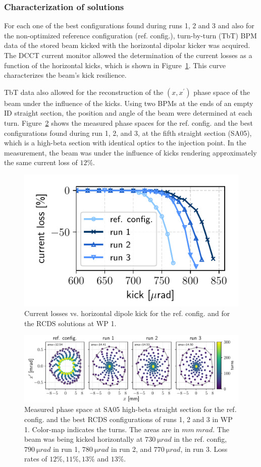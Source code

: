 \subsubsection{Characterization of solutions}
For each one of the best configurations found during runs 1, 2 and 3 and also for the non-optimized reference configuration (ref. config.), turn-by-turn (TbT) BPM data of the stored beam kicked with the horizontal dipolar kicker was acquired. The DCCT current monitor allowed the determination of the current losses as a function of the horizontal kicks, which is shown in Figure~\ref{fig:loss_kicks}. This curve characterizes the beam's kick resilience.

TbT data also allowed for the reconstruction of the $(x,x^\prime)$ phase space of the beam under the influence of the kicks. Using two BPMs at the ends of an empty ID straight section, the position and angle of the beam were determined at each turn.
Figure~\ref{fig:oldtunes_phase} shows the measured phase spaces for the ref. config. and the best configurations found during run 1, 2, and 3, at the fifth straight section (SA05), which is a high-beta section with identical optics to the injection point. In the measurement, the beam was under the influence of kicks rendering approximately the same current loss of $12\%$.
\begin{figure}[tb]
    \centering
    \includegraphics[width=0.6\columnwidth]{Images/WEPL087_f1.pdf}
    \caption{Current losses vs. horizontal dipole kick for the ref. config. and for the RCDS solutions at WP 1.}
       \label{fig:loss_kicks}
\end{figure}
\begin{figure}[tb]
    \centering
        \includegraphics[width=\textwidth]{Images/WEPL087_f2.pdf}
        \caption{Measured phase space at SA05 high-beta straight section for the ref. config. and the best RCDS configurations of runs 1, 2 and 3 in WP 1. Color-map indicates the turns. The areas are in $\unit{mm}~\unit{mrad}$. The beam was being kicked horizontally at $730~\unit{\micro rad}$ in the ref. config, $790~\unit{\micro rad}$ in run 1, $780~\unit{\micro rad}$ in run 2, and $770~\unit{\micro rad}$, in run 3. Loss rates of  $12\%, 11\%, 13\%$ and $13\%$.}
        \label{fig:oldtunes_phase}
\end{figure}


